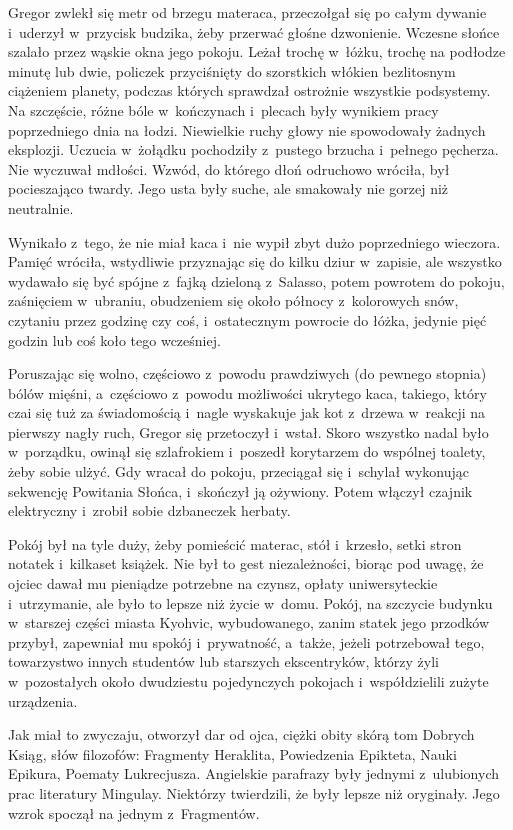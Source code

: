 \documentclass[oneside,polish,12pt,sfheadings]{mwbk}
\begin{document}
Gregor zwlekł się metr od brzegu materaca, przeczołgał się po całym
dywanie i~uderzył w~przycisk budzika, żeby przerwać głośne dzwonienie.
Wczesne słońce szalało przez wąskie okna jego pokoju. Leżał trochę w~łóżku, trochę na podłodze minutę lub dwie, policzek przyciśnięty do
szorstkich włókien bezlitosnym ciążeniem planety, podczas których
sprawdzał ostrożnie wszystkie podsystemy. Na szczęście, różne bóle w~kończynach i~plecach były wynikiem pracy poprzedniego dnia na łodzi.
Niewielkie ruchy głowy nie spowodowały żadnych eksplozji. Uczucia w~żołądku pochodziły z~pustego brzucha i~pełnego pęcherza. Nie wyczuwał
mdłości. Wzwód, do którego dłoń odruchowo wróciła, był pocieszająco
twardy. Jego usta były suche, ale smakowały nie gorzej niż neutralnie.

Wynikało z~tego, że nie miał kaca i~nie wypił zbyt dużo poprzedniego
wieczora. Pamięć wróciła, wstydliwie przyznając się do kilku dziur w~zapisie, ale wszystko wydawało się być spójne z~fajką dzieloną z~Salasso, potem powrotem do pokoju, zaśnięciem w~ubraniu, obudzeniem się
około północy z~kolorowych snów, czytaniu przez godzinę czy coś, i~ostatecznym powrocie do łóżka, jedynie pięć godzin lub coś koło tego
wcześniej.

Poruszając się wolno, częściowo z~powodu prawdziwych (do pewnego
stopnia) bólów mięśni, a~częściowo z~powodu możliwości ukrytego kaca,
takiego, który czai się tuż za świadomością i~nagle wyskakuje jak kot z~drzewa w~reakcji na pierwszy nagły ruch, Gregor się przetoczył i~wstał.
Skoro wszystko nadal było w~porządku, owinął się szlafrokiem i~poszedł
korytarzem do wspólnej toalety, żeby sobie ulżyć. Gdy wracał do pokoju,
przeciągał się i~schylał wykonując sekwencję Powitania Słońca, i~skończył ją ożywiony. Potem włączył czajnik elektryczny i~zrobił sobie
dzbaneczek herbaty.

Pokój był na tyle duży, żeby pomieścić materac, stół i~krzesło, setki
stron notatek i~kilkaset książek. Nie był to gest niezależności, biorąc
pod uwagę, że ojciec dawał mu pieniądze potrzebne na czynsz, opłaty
uniwersyteckie i~utrzymanie, ale było to lepsze niż życie w~domu. Pokój,
na szczycie budynku w~starszej części miasta Kyohvic, wybudowanego,
zanim statek jego przodków przybył, zapewniał mu spokój i~prywatność, a~także, jeżeli potrzebował tego, towarzystwo innych studentów lub
starszych ekscentryków, którzy żyli w~pozostałych około dwudziestu
pojedynczych pokojach i~współdzielili zużyte urządzenia.

Jak miał to zwyczaju, otworzył dar od ojca, ciężki obity skórą tom
Dobrych Ksiąg, słów filozofów: Fragmenty Heraklita, Powiedzenia
Epikteta, Nauki Epikura, Poematy Lukrecjusza. Angielskie parafrazy były
jednymi z~ulubionych prac literatury Mingulay. Niektórzy twierdzili, że
były lepsze niż oryginały. Jego wzrok spoczął na jednym z~Fragmentów.
\end{document}
